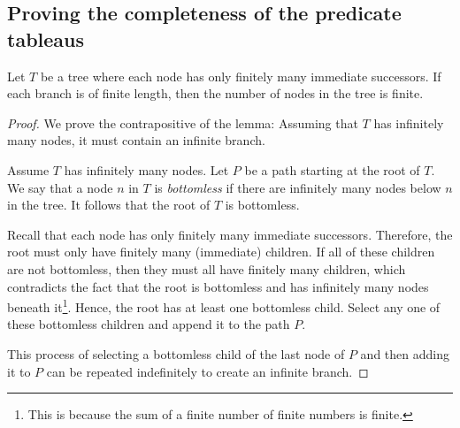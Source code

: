 \subsection{Proving the completeness of the predicate tableaus}

\begin{lemma}
    Let \(T\) be a tree where each node has only finitely many immediate successors. If each branch is of finite length, then the number of nodes in the tree is finite.
\end{lemma}
\begin{proof}
    We prove the contrapositive of the lemma: Assuming that \(T\) has infinitely many nodes, it must contain an infinite branch.

    Assume \(T\) has infinitely many nodes. Let \(P\) be a path starting at the root of \(T\). We say that a node \(n\) in \(T\) is \emph{bottomless} if there are infinitely many nodes below \(n\) in the tree. It follows that the root of \(T\) is bottomless.

    Recall that each node has only finitely many immediate successors. Therefore, the root must only have finitely many (immediate) children. If all of these children are not bottomless, then they must all have finitely many children, which  contradicts the fact that the root is bottomless and has infinitely many nodes beneath it\footnote{This is because the sum of a finite number of finite numbers is finite.}. Hence, the root has at least one bottomless child. Select any one of these bottomless children and append it to the path \(P\).

    This process of selecting a bottomless child of the last node of \(P\) and then adding it to \(P\) can be repeated indefinitely to create an infinite branch.
\end{proof}




